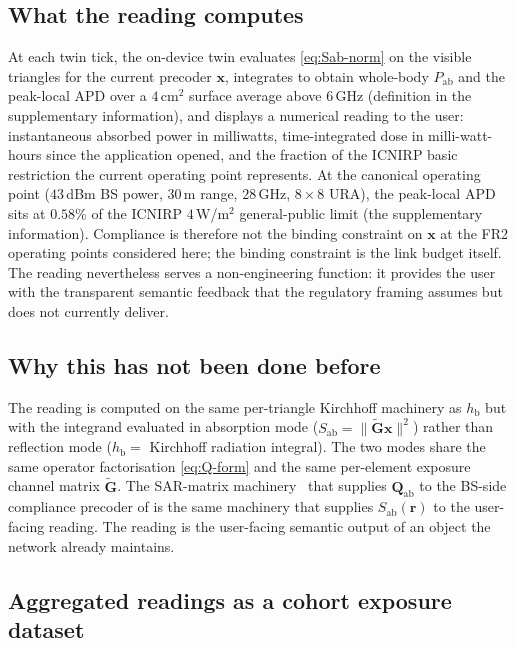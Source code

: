 \documentclass[journal,twocolumn,10pt]{IEEEtran}
\theoremstyle{plain}
\theoremstyle{definition}
\theoremstyle{remark}
\newcommand{\rr}{\mathbf{r}}
\newcommand{\xx}{\mathbf{x}}
\newcommand{\Sab}{S_{\mathrm{ab}}}
\newcommand{\Pabs}{P_{\mathrm{ab}}}
\newcommand{\Qabs}{\mathbf{Q}_{\mathrm{ab}}}
\newcommand{\hbody}{h_{\mathrm{b}}}
\begin{document}
\subsection{What the reading computes}

At each twin tick, the on-device twin evaluates \cref{eq:Sab-norm}
on the visible triangles for the current precoder $\xx$, integrates
to obtain whole-body $\Pabs$ and the peak-local APD over a
$4\,$cm$^{2}$ surface average above $6\,$GHz (definition in
the supplementary information), and displays a numerical reading to the
user: instantaneous absorbed power in milliwatts, time-integrated
dose in milli-watt-hours since the application opened, and the
fraction of the ICNIRP basic restriction the current operating
point represents. At the canonical operating point ($43\,$dBm BS
power, $30\,$m range, $28\,$GHz, $8\times 8$ URA), the peak-local
APD sits at $0.58\%$ of the ICNIRP $4\,$W/m$^{2}$ general-public
limit (the supplementary information). Compliance is therefore not the
binding constraint on $\xx$ at the FR2 operating points considered
here; the binding constraint is the link budget itself. The
reading nevertheless serves a
non-engineering function: it provides the user with the
transparent semantic feedback that the regulatory framing assumes
but does not currently deliver.

\subsection{Why this has not been done before}

The reading is computed on the same per-triangle Kirchhoff machinery
as $\hbody$ but with the integrand evaluated in absorption mode
($\Sab = \|\tilde{\bm{G}}\xx\|^{2}$) rather than reflection mode
($\hbody = $ Kirchhoff radiation integral). The two modes share the
same operator factorisation \cref{eq:Q-form} and the same per-element
exposure channel matrix $\tilde{\bm{G}}$. The SAR-matrix
machinery~\cite{Hochwald2014,Ying2015,Ying2017} that supplies
$\Qabs$ to the BS-side compliance precoder of
\cite{Wydaeghe2026jsacv5} is the same machinery that supplies
$\Sab(\rr)$ to the user-facing reading. The reading is the
user-facing semantic output of an object the network already
maintains.

\subsection{Aggregated readings as a cohort exposure dataset}
\end{document}
